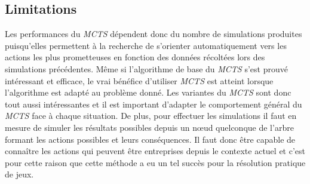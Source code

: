 \subsection*{Limitations}
Les performances du \textit{MCTS} dépendent donc du nombre de simulations produites puisqu'elles permettent à la recherche de s'orienter automatiquement vers les actions les plus prometteuses en fonction des données récoltées lors des simulations précédentes.
Même si l'algorithme de base du \textit{MCTS} s'est prouvé intéressant et efficace, le vrai bénéfice d'utiliser \textit{MCTS} est atteint lorsque l'algorithme est adapté au problème donné. Les variantes du \textit{MCTS} sont donc tout aussi intéressantes et il est important d'adapter le comportement général du \textit{MCTS} face à chaque situation.
De plus, pour effectuer les simulations il faut en mesure de simuler les résultats possibles depuis un nœud quelconque de l'arbre formant les actions possibles et leurs conséquences. Il faut donc être capable de connaître les actions qui peuvent être entreprises depuis le contexte actuel et c'est pour cette raison que cette méthode a eu un tel succès pour la résolution pratique de jeux.




%
%

